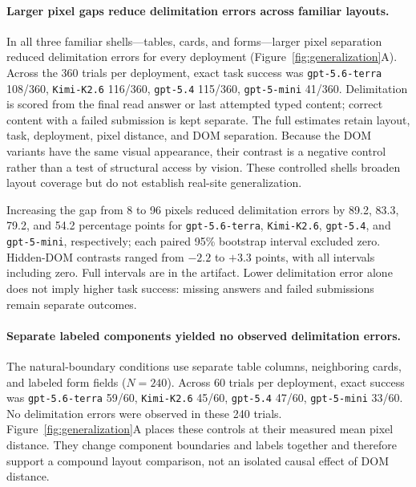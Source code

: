 \label{sec:generalization}

\paragraph{Larger pixel gaps reduce delimitation errors across familiar layouts.}
In all three familiar shells---tables, cards, and forms---larger pixel separation reduced delimitation errors for every deployment (Figure~\ref{fig:generalization}A). Across the 360 trials per deployment, exact task success was \texttt{gpt-5.6-terra} 108/360, \texttt{Kimi-K2.6} 116/360, \texttt{gpt-5.4} 115/360, \texttt{gpt-5-mini} 41/360. Delimitation is scored from the final read answer or last attempted typed content; correct content with a failed submission is kept separate. The full estimates retain layout, task, deployment, pixel distance, and DOM separation. Because the DOM variants have the same visual appearance, their contrast is a negative control rather than a test of structural access by vision. These controlled shells broaden layout coverage but do not establish real-site generalization.

Increasing the gap from 8 to 96 pixels reduced delimitation errors by 89.2, 83.3, 79.2, and 54.2 percentage points for \texttt{gpt-5.6-terra}, \texttt{Kimi-K2.6}, \texttt{gpt-5.4}, and \texttt{gpt-5-mini}, respectively; each paired 95\% bootstrap interval excluded zero. Hidden-DOM contrasts ranged from $-2.2$ to $+3.3$ points, with all intervals including zero. Full intervals are in the artifact. Lower delimitation error alone does not imply higher task success: missing answers and failed submissions remain separate outcomes.

\paragraph{Separate labeled components yielded no observed delimitation errors.}
The natural-boundary conditions use separate table columns, neighboring cards, and labeled form fields ($N=240$). Across 60 trials per deployment, exact success was \texttt{gpt-5.6-terra} 59/60, \texttt{Kimi-K2.6} 45/60, \texttt{gpt-5.4} 47/60, \texttt{gpt-5-mini} 33/60. No delimitation errors were observed in these 240 trials. Figure~\ref{fig:generalization}A places these controls at their measured mean pixel distance. They change component boundaries and labels together and therefore support a compound layout comparison, not an isolated causal effect of DOM distance.

